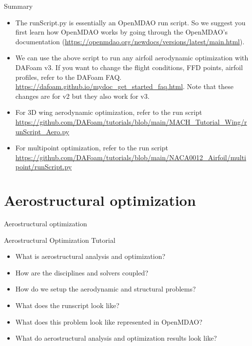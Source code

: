 \documentclass{bredelebeamer}
\begin{document}
\begin{frame}[fragile]{Summary}
    \begin{itemize}
      \setlength\itemsep{1em}
      \item The runScript.py is essentially an OpenMDAO run script. So we suggest you first learn how OpenMDAO works by going through the OpenMDAO's documentation (\url{https://openmdao.org/newdocs/versions/latest/main.html}).
     \item We can use the above script to run any airfoil aerodynamic optimization with DAFoam v3. If you want to change the flight conditions, FFD points, airfoil profiles, refer to the DAFoam FAQ. \url{https://dafoam.github.io/mydoc_get_started_faq.html}. Note that these changes are for v2 but they also work for v3.
     \item For 3D wing aerodynamic optimization, refer to the run script \url{https://github.com/DAFoam/tutorials/blob/main/MACH_Tutorial_Wing/runScript_Aero.py}
     \item For multipoint optimization, refer to the run script \url{https://github.com/DAFoam/tutorials/blob/main/NACA0012_Airfoil/multipoint/runScript.py}
    \end{itemize}
  \end{frame}
  

\section{Aerostructural optimization}
\renewcommand{\arraystretch}{2}

\begin{frame}{}
  \center \Large Aerostructural optimization
\end{frame}

\begin{frame}[fragile]{Aerostructural Optimization Tutorial}
  \begin{itemize}
    \setlength\itemsep{1em}
    \item What is aerostructural analysis and optimization?
    \item How are the disciplines and solvers coupled?
    \item How do we setup the aerodynamic and structural problems?
    \item What does the runscript look like?
    \item What does this problem look like represented in OpenMDAO?
    \item What do aerostructural analysis and optimization results look like?
  \end{itemize}
\end{frame}
\end{document}
